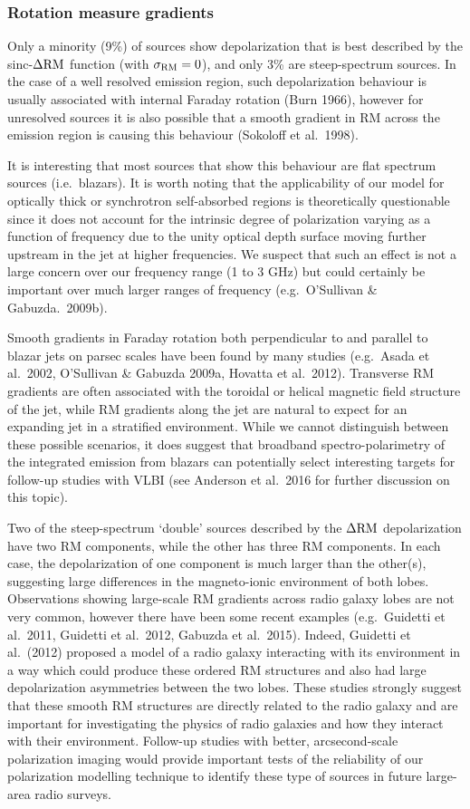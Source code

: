 \documentclass{mnras}
\newcommand*\sigmaRM{\sigma_{\rm RM}}
\newcommand*\DeltaRM{\Delta{\rm RM}}
\begin{document}
\subsubsection{Rotation measure gradients}
Only a minority (9\%) of sources show depolarization that is best described by the sinc-$\DeltaRM$ function (with $\sigmaRM=0$), and only 3\% are steep-spectrum sources. In the case of a well resolved emission region, such depolarization behaviour is usually associated with internal Faraday rotation (Burn 1966), however for unresolved sources it is also possible that a smooth gradient in RM across the emission region is causing this behaviour (Sokoloff et al.~1998). 

It is interesting that most sources that show this behaviour are flat spectrum sources (i.e.~blazars). It is worth noting that the applicability of our model for optically thick or synchrotron self-absorbed regions is theoretically questionable since it does not account for the intrinsic degree of polarization varying as a function of frequency due to the unity optical depth surface moving further upstream in the jet at higher frequencies. We suspect that such an effect is not a large concern over our frequency range (1 to 3 GHz) but could certainly be important over much larger ranges of frequency (e.g.~O'Sullivan \& Gabuzda.~2009b). 

Smooth gradients in Faraday rotation both perpendicular to and parallel to blazar jets on parsec scales have been found by many studies (e.g.~Asada et al.~2002, O'Sullivan \& Gabuzda 2009a, Hovatta et al.~2012). Transverse RM gradients are often associated with the toroidal or helical magnetic field structure of the jet, while RM gradients along the jet are natural to expect for an expanding jet in a stratified environment. While we cannot distinguish between these possible scenarios, it does suggest that broadband spectro-polarimetry of the integrated emission from blazars can potentially select interesting targets for follow-up studies with VLBI (see Anderson et al.~2016 for further discussion on this topic). 

Two of the steep-spectrum `double' sources described by the $\DeltaRM$ depolarization have two RM components, while the other has three RM components. In each case, the depolarization of one component is much larger than the other(s), suggesting large differences in the magneto-ionic environment of both lobes. 
Observations showing large-scale RM gradients across radio galaxy lobes are not very common, however there have been some recent examples (e.g.~Guidetti et al.~2011, Guidetti et al.~2012, Gabuzda et al.~2015). Indeed, Guidetti et al.~(2012) proposed a model of a radio galaxy interacting with its environment in a way which could produce these ordered RM structures and also had large depolarization asymmetries between the two lobes. 
These studies strongly suggest that these smooth RM structures are directly related to the radio galaxy and are important for investigating the physics of radio galaxies and how they interact with their environment. Follow-up studies with better, arcsecond-scale polarization imaging would provide important tests of the reliability of our polarization modelling technique to identify these type of sources in future large-area radio surveys. 
\end{document}
